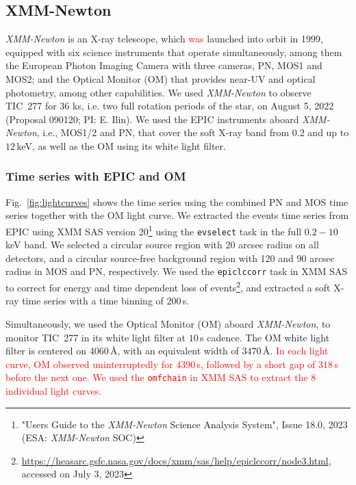 \documentclass[twocolumn]{aastex631}
\begin{document}
\subsection{XMM-Newton}
\label{sec:obs:xmm}
\textit{XMM-Newton} is an X-ray telescope, which \textcolor{red}{was} launched into orbit in 1999, equipped with six science instruments that operate simultaneously, among them the European Photon Imaging Camera with three cameras, PN, MOS1 and MOS2; and the Optical Monitor (OM) that provides near-UV and optical photometry, among other capabilities.
We used \textit{XMM-Newton} to observe TIC~277 for 36 ks, i.e. two full rotation periods of the star, on August 5, 2022 (Proposal 090120; PI: E. Ilin). We used the EPIC instruments aboard \textit{XMM-Newton}, i.e., MOS1/2 and PN, that cover the soft X-ray band from $0.2$ and up to $12\,$keV, as well as the OM using its white light filter.

\subsubsection{Time series with EPIC and OM}

Fig.~\ref{fig:lightcurves} shows the time series using the combined PN and MOS time series together with the OM light curve. We extracted the events time series from EPIC using XMM SAS version 20\footnote{"Users Guide to the \textit{XMM-Newton} Science Analysis System", Issue 18.0, 2023 (ESA: \textit{XMM-Newton} SOC)} using the \texttt{evselect} task in the full $0.2-10\,$keV band. We selected a circular source region with 20 arcsec radius on all detectors, and a circular source-free background region with 120 and 90 arcsec radius in MOS and PN, respectively. We used the \texttt{epiclccorr} task in XMM SAS to correct for energy and time dependent loss of events\footnote{\url{https://heasarc.gsfc.nasa.gov/docs/xmm/sas/help/epiclccorr/node3.html}, accessed on July 3, 2023}, and extracted a soft X-ray time series with a time binning of $200\,$s.

Simultaneously, we used the Optical Monitor (OM) aboard \textit{XMM-Newton}, to monitor TIC~277 in its white light filter at $10$\,s cadence. The OM white light filter is centered on $4060\,$\AA, with an equivalent width of $3470\,$\AA. \textcolor{red}{In each light curve, OM observed uninterruptedly for $4390\,$s, followed by a short gap of $318\,$s before the next one. We used the \texttt{omfchain} in XMM SAS to extract the 8 individual light curves. }
\end{document}
